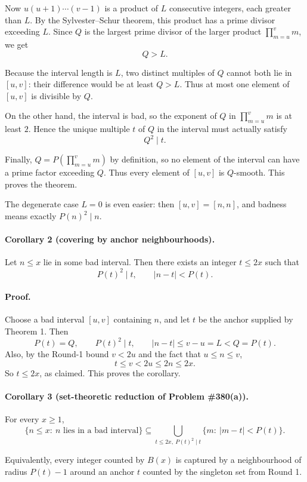 Now $u(u+1)\cdots (v-1)$ is a product of $L$ consecutive integers, each greater than $L$. By the Sylvester--Schur theorem, this product has a prime divisor exceeding $L$. Since $Q$ is the largest prime divisor of the larger product $\prod_{m=u}^{v}m$, we get
\[
Q>L.
\]

Because the interval length is $L$, two distinct multiples of $Q$ cannot both lie in $[u,v]$: their difference would be at least $Q>L$. Thus at most one element of $[u,v]$ is divisible by $Q$.

On the other hand, the interval is bad, so the exponent of $Q$ in $\prod_{m=u}^{v}m$ is at least $2$. Hence the unique multiple $t$ of $Q$ in the interval must actually satisfy
\[
Q^2\mid t.
\]

Finally, $Q=P\!\left(\prod_{m=u}^{v}m\right)$ by definition, so no element of the interval can have a prime factor exceeding $Q$. Thus every element of $[u,v]$ is $Q$-smooth.
This proves the theorem.

\medskip

\noindent The degenerate case $L=0$ is even easier: then $[u,v]=[n,n]$, and badness means exactly $P(n)^2\mid n$.

\paragraph{Corollary 2 (covering by anchor neighbourhoods).}
Let $n\le x$ lie in some bad interval. Then there exists an integer $t\le 2x$ such that
\[
P(t)^2\mid t
,\qquad
|n-t|<P(t).
\]

\paragraph{Proof.}
Choose a bad interval $[u,v]$ containing $n$, and let $t$ be the anchor supplied by Theorem 1. Then
\[
P(t)=Q,\qquad P(t)^2\mid t,\qquad |n-t|\le v-u=L<Q=P(t).
\]
Also, by the Round-1 bound $v<2u$ and the fact that $u\le n\le v$,
\[
t\le v<2u\le 2n\le 2x.
\]
So $t\le 2x$, as claimed.
This proves the corollary.

\paragraph{Corollary 3 (set-theoretic reduction of Problem \#380(a)).}
For every $x\ge 1$,
\[
\{n\le x:\ n \mbox{ lies in a bad interval}\}
\subseteq
\bigcup_{t\le 2x,\ P(t)^2\mid t}
\{m:\ |m-t|<P(t)\}.
\]

Equivalently, every integer counted by $B(x)$ is captured by a neighbourhood of radius $P(t)-1$ around an anchor $t$ counted by the singleton set from Round 1.

